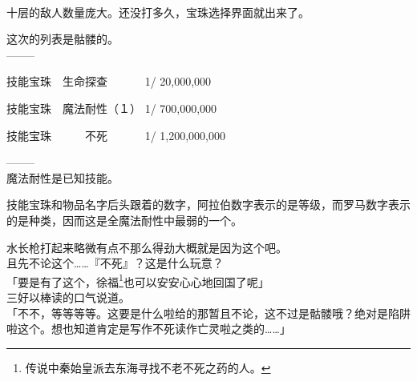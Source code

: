 \sqsplit\\

十层的敌人数量庞大。还没打多久，宝珠选择界面就出来了。

这次的列表是骷髅的。\\

  --------

  技能宝珠　生命探查　　　 1/    20,000,000

  技能宝珠　魔法耐性（１） 1/   700,000,000

  技能宝珠　　　不死　　　 1/ 1,200,000,000

  --------\\

魔法耐性是已知技能。

技能宝珠和物品名字后头跟着的数字，阿拉伯数字表示的是等级，而罗马数字表示的是种类，因而这是全魔法耐性中最弱的一个。

水长枪打起来略微有点不那么得劲大概就是因为这个吧。\\

且先不论这个……『不死』？这是什么玩意？\\

「要是有了这个，徐福\footnote{传说中秦始皇派去东海寻找不老不死之药的人。}也可以安安心心地回国了呢」\\

三好以棒读的口气说道。\\

「不不，等等等等。这要是什么啦给的那暂且不论，这不过是骷髅哦？绝对是陷阱啦这个。想也知道肯定是写作不死读作亡灵啦之类的……」\\

